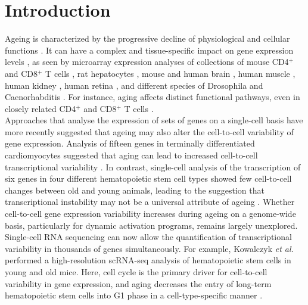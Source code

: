 
\section{Introduction} 

Ageing is characterized by the progressive decline of physiological and cellular functions \citep{Lopez-Otin2013, Booth2016}. It can have a complex and tissue-specific impact on gene expression levels \citep{Zahn2007}, as seen by microarray expression analyses of collections of mouse CD4$^+$ and CD8$^+$ T cells \citep{Mirza2011}, rat hepatocytes \citep{Tollet-Egnell2000}, mouse and human brain \citep{Lu2004, Lee2000}, human muscle \citep{Welle2003, Zahn2006}, human kidney \citep{Rodwell2004}, human retina \citep{Yoshida2002}, and different species of Drosophila and Caenorhabditis \citep{Mccarroll2004}. For instance, aging affects distinct functional pathways, even in closely related CD4$^+$ and CD8$^+$ T cells \citep{Mirza2011}. \\

Approaches that analyse the expression of sets of genes on a single-cell basis have more recently suggested that ageing may also alter the cell-to-cell variability of gene expression. Analysis of fifteen genes in terminally differentiated cardiomyocytes suggested that aging can lead to increased cell-to-cell transcriptional variability \citep{Bahar2006}. In contrast, single-cell analysis of the transcription of six genes in four different hematopoietic stem cell types showed few cell-to-cell changes between old and young animals, leading to the suggestion that transcriptional instability may not be a universal attribute of ageing \citep{Warren2007}. Whether cell-to-cell gene expression variability increases during ageing on a genome-wide basis, particularly for dynamic activation programs, remains largely unexplored.\\

Single-cell RNA sequencing can now allow the quantification of transcriptional variability in thousands of genes simultaneously. For example, Kowalczyk \textit{et al.} performed a high-resolution scRNA-seq analysis of hematopoietic stem cells in young and old mice. Here, cell cycle is the primary driver for cell-to-cell variability in gene expression, and aging decreases the entry of long-term hematopoietic stem cells into G1 phase in a cell-type-specific manner \citep{Kowalczyk2015}.\\ 

